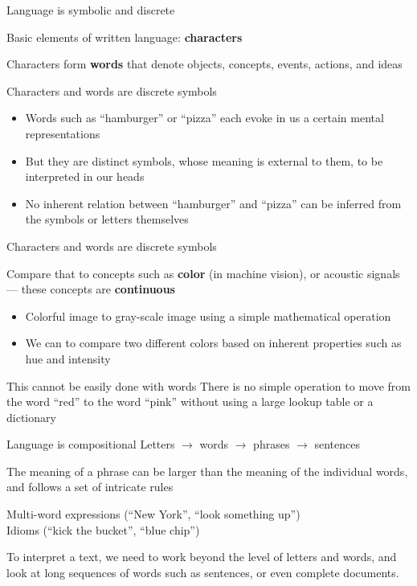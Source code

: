 \documentclass[12pt,aspectratio=169,handout]{beamer}
\begin{document}
\begin{frame}{Language is symbolic and discrete}

Basic elements of written language: \textbf{characters}

Characters form \textbf{words} that denote objects, concepts, events, actions, and ideas

\begin{block}{Characters and words are discrete symbols}
\begin{itemize}
	\item Words such as ``hamburger'' or ``pizza'' each evoke in us a certain mental representations
	\item But they are distinct symbols, whose meaning is external to them, to be interpreted in our heads
	\item No inherent relation between ``hamburger'' and ``pizza'' can be inferred from the symbols or letters themselves
\end{itemize}
\end{block}
	
\end{frame}

\begin{frame}{Characters and words are discrete symbols}

Compare that to concepts such as \textbf{color} (in machine vision), or acoustic
signals --- these concepts are \textbf{continuous}

\begin{itemize}
	\item Colorful image to gray-scale image using a simple mathematical operation
	\item We can to compare two different colors based on inherent properties such as hue and intensity
\end{itemize}

\begin{block}{This cannot be easily done with words}
There is no simple operation to move from the word ``red'' to the word ``pink'' without using a large lookup table or a dictionary
\end{block}

\end{frame}


\begin{frame}{Language is compositional}
Letters $\to$ words $\to$ phrases $\to$ sentences

The meaning of a phrase can be larger than the meaning of the individual words,	and follows a set of intricate rules

\begin{example}
Multi-word expressions (``New York'', ``look something up'') \\
Idioms (``kick the bucket'', ``blue chip'')
\end{example}
	
To interpret a text, we need to work beyond the level of letters and words, and look at long sequences of words such as sentences, or even complete documents.
\end{frame}
\end{document}

